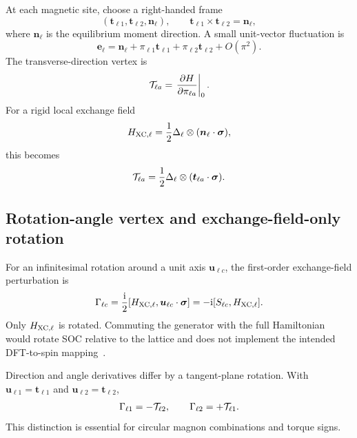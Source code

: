 At each magnetic site, choose a right-handed frame
\begin{equation}
(\bm t_{\ell1},\bm t_{\ell2},\bm n_\ell),
\qquad
\bm t_{\ell1}\times\bm t_{\ell2}=\bm n_\ell,
\label{eq:local-frame}
\end{equation}
where $\bm n_\ell$ is the equilibrium moment direction. A small unit-vector fluctuation is
\begin{equation}
\bm e_\ell=\bm n_\ell
+\pi_{\ell1}\bm t_{\ell1}
+\pi_{\ell2}\bm t_{\ell2}+O(\pi^2).
\label{eq:pi-coordinate}
\end{equation}
The transverse-direction vertex is
\begin{equation}
\mathcal T_{\ell a}
=\left.\frac{\partial H}{\partial\pi_{\ell a}}\right|_0.
\label{eq:direction-vertex}
\end{equation}
For a rigid local exchange field
\begin{equation}
H_{\mathrm{XC},\ell}
=\frac12\Delta_\ell\otimes
(\bm n_\ell\cdot\bm\sigma),
\end{equation}
this becomes
\begin{equation}
\mathcal T_{\ell a}
=\frac12\Delta_\ell\otimes
(\bm t_{\ell a}\cdot\bm\sigma).
\label{eq:rigid-direction-vertex}
\end{equation}

\subsection{Rotation-angle vertex and exchange-field-only rotation}

For an infinitesimal rotation around a unit axis $\bm u_{\ell c}$, the first-order exchange-field perturbation is~\cite{MartinezCarracedo2023}
\begin{equation}
\Gamma_{\ell c}
=\frac{\mathrm{i}}{2}
[H_{\mathrm{XC},\ell},\bm u_{\ell c}\cdot\bm\sigma]
=-\mathrm{i}[S_{\ell c},H_{\mathrm{XC},\ell}].
\label{eq:rotation-vertex}
\end{equation}
Only $H_{\mathrm{XC},\ell}$ is rotated. Commuting the generator with the full Hamiltonian would rotate SOC relative to the lattice and does not implement the intended DFT-to-spin mapping~\cite{MartinezCarracedo2023}.

Direction and angle derivatives differ by a tangent-plane rotation. With $\bm u_{\ell1}=\bm t_{\ell1}$ and $\bm u_{\ell2}=\bm t_{\ell2}$,
\begin{equation}
\Gamma_{\ell1}=-\mathcal T_{\ell2},
\qquad
\Gamma_{\ell2}=+\mathcal T_{\ell1}.
\label{eq:coordinate-map}
\end{equation}
This distinction is essential for circular magnon combinations and torque signs.

